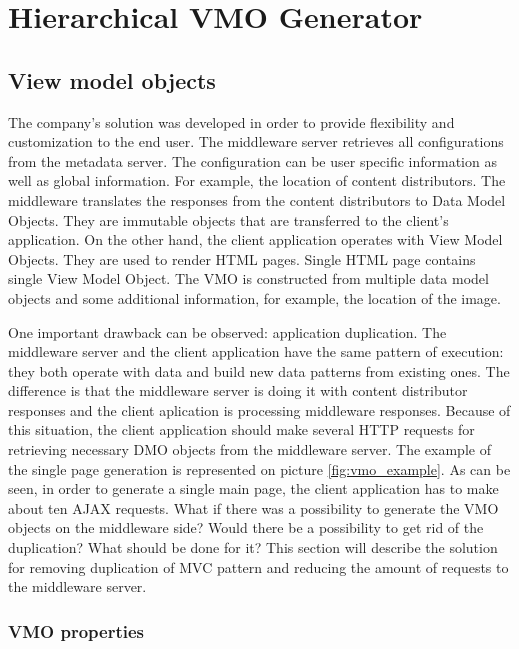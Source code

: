 \section{Hierarchical VMO Generator}

\subsection{View model objects}

The company's solution was developed in order to provide flexibility and customization to the end user. The middleware server retrieves all configurations from the metadata server. The configuration can be user specific information as well as global information. For example, the location of content distributors. The middleware translates the responses from the content distributors to Data Model Objects. They are immutable objects that are transferred to the client's application. On the other hand, the client application operates with View Model Objects. They are used to render HTML pages. Single HTML page contains single View Model Object. The VMO is constructed from multiple data model objects and some additional information, for example, the location of the image.   

One important drawback can be observed: application duplication. The middleware server and the client application have the same pattern of execution: they both operate with data and build new data patterns from existing ones. The difference is that the middleware server is doing it with content distributor responses and the client aplication is processing middleware responses. Because of this situation, the client application should make several HTTP requests for retrieving necessary DMO objects from the middleware server. The example of the single page generation is represented on picture \ref{fig:vmo_example}. As can be seen, in order to generate a single main page, the client application has to make about ten AJAX requests. What if there was a possibility to generate the VMO objects on the middleware side? Would there be a possibility to get rid of the duplication? What should be done for it? This section will describe the solution for removing duplication of MVC pattern and reducing the amount of requests to the middleware server. 

\subsubsection{VMO properties}


